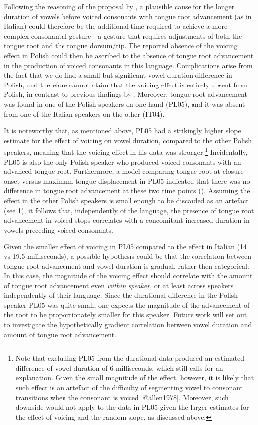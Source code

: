 \documentclass[authoryear, twocolumn]{elsarticle}
\begin{document}
Following the reasoning of the proposal by \citet{halle1967}, a
plausible cause for the longer duration of vowels before voiced
consonants with tongue root advancement (as in Italian) could therefore
be the additional time required to achieve a more complex consonantal
gesture---a gesture that requires adjustments of both the tongue root
and the tongue dorsum/tip. The reported absence of the voicing effect in
Polish could then be ascribed to the absence of tongue root advancement
in the production of voiced consonants in this language. Complications
arise from the fact that we do find a small but significant vowel
duration difference in Polish, and therefore cannot claim that the
voicing effect is entirely absent from Polish, in contrast to previous
findings by \citet{keating1984}. Moreover, tongue root advancement was
found in one of the Polish speakers on one hand (PL05), and it was
absent from one of the Italian speakers on the other (IT04).

It is noteworthy that, as mentioned above, PL05 had a strikingly higher
slope estimate for the effect of voicing on vowel duration, compared to
the other Polish speakers, meaning that the voicing effect in his data
was
stronger.\footnote{\label{fn:polish-small} Note that excluding PL05 from the durational data produced an estimated difference of vowel duration of 6 milliseconds, which still calls for an explanation. Given the small magnitude of the effect, however, it is likely that such effect is an artefact of the difficulty of segmenting vowel to consonant transitions when the consonant is voiced [@allen1978]. Moreover, such downside would not apply to the data in PL05 given the larger estimates for the effect of voicing and the random slope, as discussed above.}
Incidentally, PL05 is also the only Polish speaker who produced voiced
consonants with an advanced tongue root. Furthermore, a model comparing
tongue root at closure onset versus maximum tongue displacement in PL05
indicated that there was no difference in tongue root advancement at
these two time points (). Assuming the effect in the other Polish
speakers is small enough to be discarded as an artefact (see
\cref{fn:polish-small}), it follows that, independently of the language,
the presence of tongue root advancement in voiced stops correlates with
a concomitant increased duration in vowels preceding voiced consonants.

Given the smaller effect of voicing in PL05 compared to the effect in
Italian (14 vs 19.5 milliseconds), a possible hypothesis could be that
the correlation between tongue root advancement and vowel duration is
gradual, rather then categorical. In this case, the magnitude of the
voicing effect should correlate with the amount of tongue root
advancement even \emph{within speaker}, or at least across speakers
independently of their language. Since the durational difference in the
Polish speaker PL05 was quite small, one expects the magnitude of the
advancement of the root to be proportionately smaller for this speaker.
Future work will set out to investigate the hypothetically gradient
correlation between vowel duration and amount of tongue root
advancement.
\end{document}
